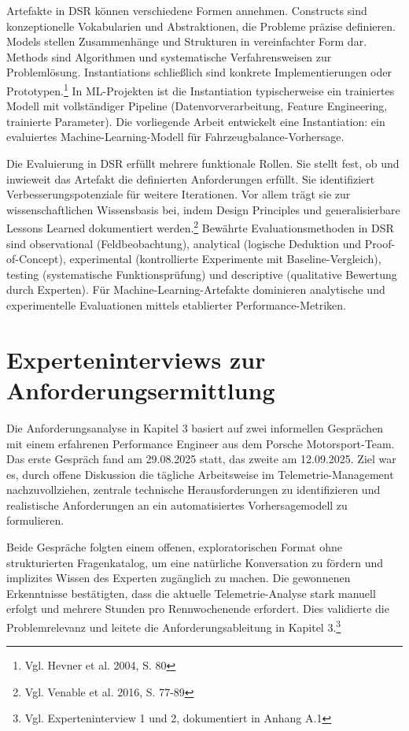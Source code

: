 Artefakte in DSR können verschiedene Formen annehmen. Constructs sind konzeptionelle Vokabularien und Abstraktionen, die Probleme präzise definieren. Models stellen Zusammenhänge und Strukturen in vereinfachter Form dar. Methods sind Algorithmen und systematische Verfahrensweisen zur Problemlösung. Instantiations schließlich sind konkrete Implementierungen oder Prototypen.\footnote{Vgl. Hevner et al. 2004, S. 80} In ML-Projekten ist die Instantiation typischerweise ein trainiertes Modell mit vollständiger Pipeline (Datenvorverarbeitung, Feature Engineering, trainierte Parameter). Die vorliegende Arbeit entwickelt eine Instantiation: ein evaluiertes Machine-Learning-Modell für Fahrzeugbalance-Vorhersage.

Die Evaluierung in DSR erfüllt mehrere funktionale Rollen. Sie stellt fest, ob und inwieweit das Artefakt die definierten Anforderungen erfüllt. Sie identifiziert Verbesserungspotenziale für weitere Iterationen. Vor allem trägt sie zur wissenschaftlichen Wissensbasis bei, indem Design Principles und generalisierbare Lessons Learned dokumentiert werden.\footnote{Vgl. Venable et al. 2016, S. 77-89} Bewährte Evaluationsmethoden in DSR sind observational (Feldbeobachtung), analytical (logische Deduktion und Proof-of-Concept), experimental (kontrollierte Experimente mit Baseline-Vergleich), testing (systematische Funktionsprüfung) und descriptive (qualitative Bewertung durch Experten). Für Machine-Learning-Artefakte dominieren analytische und experimentelle Evaluationen mittels etablierter Performance-Metriken.

\section{Experteninterviews zur Anforderungsermittlung}

Die Anforderungsanalyse in Kapitel 3 basiert auf zwei informellen Gesprächen mit einem erfahrenen Performance Engineer aus dem Porsche Motorsport-Team. Das erste Gespräch fand am 29.08.2025 statt, das zweite am 12.09.2025. Ziel war es, durch offene Diskussion die tägliche Arbeitsweise im Telemetrie-Management nachzuvollziehen, zentrale technische Herausforderungen zu identifizieren und realistische Anforderungen an ein automatisiertes Vorhersagemodell zu formulieren.

Beide Gespräche folgten einem offenen, exploratorischen Format ohne strukturierten Fragenkatalog, um eine natürliche Konversation zu fördern und implizites Wissen des Experten zugänglich zu machen. Die gewonnenen Erkenntnisse bestätigten, dass die aktuelle Telemetrie-Analyse stark manuell erfolgt und mehrere Stunden pro Rennwochenende erfordert. Dies validierte die Problemrelevanz und leitete die Anforderungsableitung in Kapitel 3.\footnote{Vgl. Experteninterview 1 und 2, dokumentiert in Anhang A.1} 
